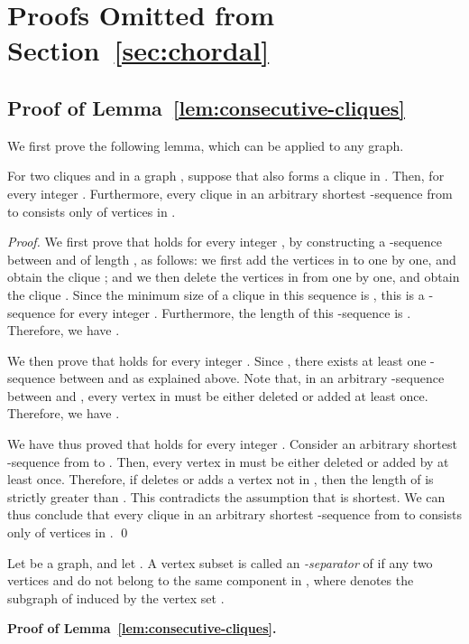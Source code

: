 \documentclass{llncs}
\newcounter{one}
\newcounter{two}
\begin{document}
	\section{Proofs Omitted from Section~\ref{sec:chordal}}
	
	\subsection{Proof of Lemma~\ref{lem:consecutive-cliques}} \label{app:oneclique}
	We first prove the following lemma, which can be applied to any graph. 
	\begin{lemma} \label{lem:tar-dist-in-a-clique}
	For two cliques  and  in a graph , suppose that  also forms a clique in .
	Then,  for every integer .
	Furthermore,  every clique in an arbitrary shortest -sequence from  to  consists only of vertices in .
	\end{lemma}
	\begin{proof}
	We first prove that  holds for every integer , by constructing a -sequence between  and  of length , as follows:
we first add the vertices in  to  one by one, and obtain the clique ; and 
we then delete the vertices in  from  one by one, and obtain the clique .
	Since the minimum size of a clique in this sequence is , this is a -sequence for every integer . 
	Furthermore, the length of this -sequence is .
	Therefore, we have .
	
	We then prove that  holds for every integer .
	Since , there exists at least one -sequence between  and  as explained above. 
	Note that, in an arbitrary -sequence between  and , every vertex in  must be either deleted or added at least once. 
	Therefore, we have .
	
	We have thus proved that  holds for every integer .
	Consider an arbitrary shortest -sequence  from  to . 
	Then, every vertex in  must be either deleted or added by  at least once.
	Therefore, if  deletes or adds a vertex not in , then the length of  is strictly greater than .
	This contradicts the assumption that  is shortest.
	We can thus conclude that every clique in an arbitrary shortest -sequence from  to  consists only of vertices in .
	\qed
	\end{proof}

	Let  be a graph, and let .
	A vertex subset  is called an \emph{-separator} of  if any two vertices  and  do not belong to the same component in , where  denotes the subgraph of  induced by the vertex set .
\medskip

	\noindent
	{\bf Proof of Lemma~\ref{lem:consecutive-cliques}.}
\end{document}
